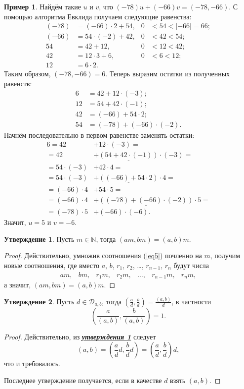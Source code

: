 \documentclass[14pt, a4paper]{extarticle}
\theoremstyle{definition}
\newtheorem{example}{Пример}
\newtheorem{statement}{Утверждение}
\begin{document}
	\begin{example}
		Найдём такие $u$ и $v$, что $(-78)u+(-66)v=(-78,-66)$. С помощью алгоритма Евклида получаем следующие равенства:
		\begin{align*}
				(-78)&=(-66)\cdot2+54,&0&<54<|-66|=66;\\
				(-66)&=54\cdot(-2)+42,&0&<42<54;\\
				54&=42+12,&0&<12<42;\\
				42&=12\cdot3+6,&0&<6<12;\\
				12&=6\cdot2.
		\end{align*}
		Таким образом, $(-78,-66)=6$. Теперь выразим остатки из полученных равенств:
		\begin{align*}
			6&=42+12\cdot(-3);\\
			12&=54+42\cdot(-1);\\
			42&=(-66)+54\cdot2;\\
			54&=(-78)+(-66)\cdot(-2).
		\end{align*}
		Начнём последовательно в первом равенстве заменять остатки:
		\begin{align*}
			6=42&+\boxed{12}\cdot(-3)=\\
			=42&+\underline{(54+42\cdot(-1))}\cdot(-3)=\\
			=54\cdot(-3)&+\boxed{42}\cdot4=\\
			=54\cdot(-3)&+\underline{((-66)+54\cdot2)}\cdot4=\\
			=(-66)\cdot4&+\boxed{54}\cdot5=\\
			=(-66)\cdot4&+\underline{((-78)+(-66)\cdot(-2))}\cdot5=\\
			=\boxed{(-78)}\cdot5&+\boxed{(-66)}\cdot(-6).
		\end{align*}
		Значит, $u=5$ и $v=-6$.
	\end{example}

	\begin{statement}
	\label{vyn}
		Пусть $m\in\mathbb{N}$, тогда $(am,bm)=(a,b)m$.
	\end{statement}
	\begin{proof}
		Действительно, умножив соотношения (\ref{eq5}) почленно на $m$, получим новые соотношения, где вместо $a$, $b$, $r_1$, $r_2$, \dots, $r_{n-1}$, $r_n$ будут числа
		$$\begin{array}{ccccccc}
			am,&bm,&r_1m,&r_2m,&\dots,&r_{n-1}m,&r_nm,
		\end{array}$$
		а значит, $(am,bm)=(a,b)m$.
	\end{proof}

	\begin{statement}
	\label{delpr}
		Пусть $d\in\mathcal{D}_{a,b}$, тогда $\left(\frac{a}{d},\frac{b}{d}\right)=\frac{(a,b)}{d}$, в частности $$\boxed{\left(\frac{a}{(a,b)},\frac{b}{(a,b)}\right)=1.}$$
	\end{statement}
	\begin{proof}
		Действительно, из \hyperref[vyn]{\textbf{\textit{утверждения \ref*{vyn}}}} следует $$(a,b)=\left(\frac{a}{d}d,\frac{b}{d}d\right)=\left(\frac{a}{d},\frac{b}{d}\right)d,$$ что и требовалось.
		
		Последнее утверждение получается, если в качестве $d$ взять $(a,b)$.
	\end{proof}
\end{document}

